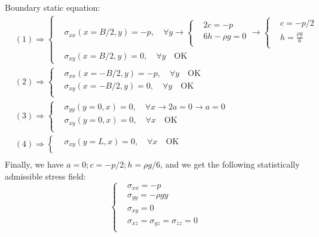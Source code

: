 Boundary static equation:
\begin{equation}
\begin{split}
& (1) \Rightarrow \left\lbrace \begin{split} & \sigma_{xx}(x=B/2, y) = -p, \quad \forall y \rightarrow \left\lbrace \begin{split}
& 2c=-p\\
& 6h-\rho g=0\\
\end{split} \right. \rightarrow \left\lbrace \begin{split}
& c=-p/2\\
& h = \frac{\rho g}{6}\\
\end{split} \right.\\  
& \sigma_{xy}(x=B/2,y)=0, \quad \forall y \quad \text{OK}
\end{split} \right.\\
& (2) \Rightarrow \left\lbrace \begin{split}
& \sigma_{xx}(x=-B/2,y)=-p, \quad \forall y \quad \text{OK} \\
& \sigma_{xy}(x=-B/2,y)=0, \quad \forall y \quad \text{OK} \\
\end{split} \right. \\ 
& (3) \Rightarrow \left\lbrace \begin{split}
& \sigma_{yy}(y=0,x)=0, \quad \forall x \rightarrow 2a = 0 \rightarrow a = 0 \\
& \sigma_{xy}(y=0,x)=0, \quad \forall x \quad \text{OK} \\
\end{split} \right. \\ 
& (4) \Rightarrow \left\lbrace \begin{split}
& \sigma_{xy}(y=L,x)=0, \quad \forall x \quad \text{OK} \\
\end{split} \right. \\ 
\end{split}
\end{equation}
Finally, we have $a=0; c=-p/2; h=\rho g/6$, and we get the following statistically admissible stress field:
\begin{equation}
\left\lbrace
\begin{split}
& \sigma_{xx}=-p \\
& \sigma_{yy}=-\rho gy \\
& \sigma_{xy}=0 \\
& \sigma_{xz}=\sigma_{yz}=\sigma_{zz}=0 \\
\end{split}
\right.
\end{equation}
\\

